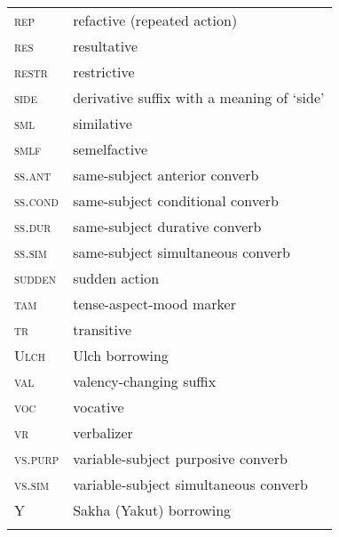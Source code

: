 \documentclass[output=paper]{langscibook}
\begin{document}
\begin{tabularx}{.45\textwidth}{lQ}
\textsc{rep} & refactive (repeated action)\\
\textsc{res} & resultative\\
\textsc{restr} & restrictive\\
\textsc{side} & derivative suffix with a meaning of ‘side’\\
\textsc{sml} & similative\\
\textsc{smlf} & semelfactive\\
\textsc{ss.ant} & same-subject anterior converb\\
\textsc{ss.cond} & same-subject conditional converb\\
\textsc{ss.dur} & same-subject durative converb\\
\textsc{ss.sim} & same-subject simultaneous converb\\
\textsc{sudden} & sudden action\\
\textsc{tam} & tense-aspect-mood marker\\
\textsc{tr}  & transitive\\
\textsc{Ulch} & Ulch borrowing\\
\textsc{val} & valency-changing suffix\\
\textsc{voc} & vocative\\
\textsc{vr} & verbalizer\\
\textsc{vs.purp} & variable-subject purposive converb\\
\textsc{vs.sim} & variable-subject simultaneous converb\\
Y & Sakha (Yakut) borrowing\\
\\
\end{tabularx}

\sloppy\printbibliography[heading=subbibliography,notkeyword=this]
\end{document}
